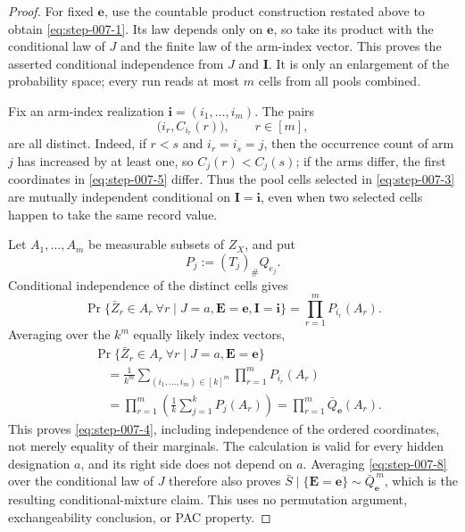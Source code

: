 \begin{proof}

For fixed \(\mathbf e\), use the countable product construction
restated above to obtain \eqref{eq:step-007-1}.  Its law depends only on \(\mathbf e\),
so take its product with the conditional law of \(J\) and the finite
law of the arm-index vector.  This proves the asserted conditional
independence from \(J\) and \(\mathbf I\).  It is only an enlargement
of the probability space; every run reads at most \(m\) cells from
all pools combined.

Fix an arm-index realization
\(\mathbf i=(i_1,\ldots,i_m)\).  The pairs
\[
\bigl(i_r,C_{i_r}(r)\bigr),\qquad r\in[m],
\tag{5}\label{eq:step-007-5}
\]
are all distinct.  Indeed, if \(r<s\) and \(i_r=i_s=j\), then the
occurrence count of arm \(j\) has increased by at least one, so
\(C_j(r)<C_j(s)\); if the arms differ, the first coordinates in \eqref{eq:step-007-5}
differ.  Thus the pool cells selected in \eqref{eq:step-007-3} are mutually independent
conditional on \(\mathbf I=\mathbf i\), even when two selected cells
happen to take the same record value.

Let \(A_1,\ldots,A_m\) be measurable subsets of \(Z_X\), and put
\[
P_j:=(T_j)_\#Q_{e_j}.
\tag{6}\label{eq:step-007-6}
\]
Conditional independence of the distinct cells gives
\[
\Pr\{\bar Z_r\in A_r\ \forall r\mid
J=a,\mathbf E=\mathbf e,\mathbf I=\mathbf i\}
=\prod_{r=1}^m P_{i_r}(A_r).
\tag{7}\label{eq:step-007-7}
\]
Averaging over the \(k^m\) equally likely index vectors,
\[
\begin{aligned}
&\Pr\{\bar Z_r\in A_r\ \forall r\mid
J=a,\mathbf E=\mathbf e\}\\
&\quad=
\frac1{k^m}
\sum_{(i_1,\ldots,i_m)\in[k]^m}
\prod_{r=1}^mP_{i_r}(A_r)\\
&\quad=
\prod_{r=1}^m
\left(\frac1k\sum_{j=1}^kP_j(A_r)\right)
=\prod_{r=1}^m\bar Q_{\mathbf e}(A_r).
\end{aligned}
\tag{8}\label{eq:step-007-8}
\]
This proves \eqref{eq:step-007-4}, including independence of the ordered coordinates,
not merely equality of their marginals.  The calculation is valid for
every hidden designation \(a\), and its right side does not depend on
\(a\).  Averaging \eqref{eq:step-007-8} over the conditional law of \(J\) therefore
also proves \(\bar S\mid\{\mathbf E=\mathbf e\}\sim
\bar Q_{\mathbf e}^{\,m}\), which is the resulting conditional-mixture
claim.  This uses no permutation argument, exchangeability conclusion,
or PAC property.

\end{proof}


